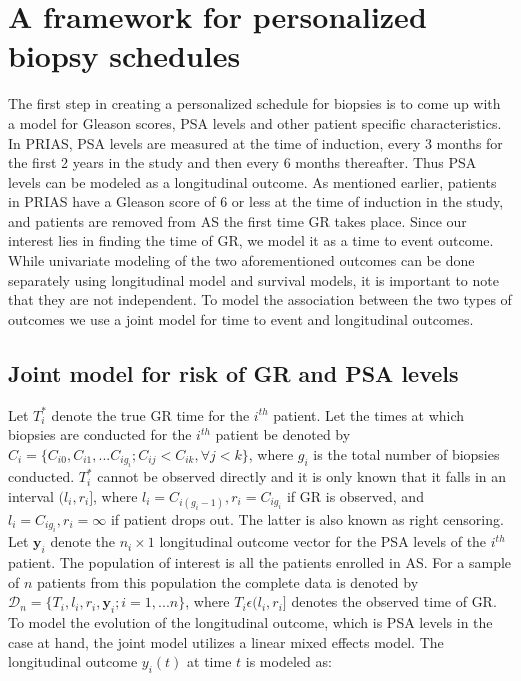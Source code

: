 
\section{A framework for personalized biopsy schedules}
\label{sec : framework_pers_biop_sched}
The first step in creating a personalized schedule for biopsies is to come up with a model for Gleason scores, PSA levels and other patient specific characteristics. In PRIAS, PSA levels are measured at the time of induction, every 3 months for the first 2 years in the study and then every 6 months thereafter. Thus PSA levels can be modeled as a longitudinal outcome. As mentioned earlier, patients in PRIAS have a Gleason score of 6 or less at the time of induction in the study, and patients are removed from AS the first time GR takes place. Since our interest lies in finding the time of GR, we model it as a time to event outcome. While univariate modeling of the two aforementioned outcomes can be done separately using longitudinal model and survival models, it is important to note that they are not independent. To model the association between the two types of outcomes we use a joint model for time to event and longitudinal outcomes.

\subsection{Joint model for risk of GR and PSA levels}
\label{subsec : jm_definition}
Let $T_i^*$ denote the true GR time for the $i^{th}$ patient. Let the times at which biopsies are conducted for the $i^{th}$ patient be denoted by $C_i = \{C_{i0}, C_{i1}, ... C_{ig_i}; C_{ij} < C_{ik}, \forall j<k \}$, where $g_i$ is the total number of biopsies conducted. $T_i^*$ cannot be observed directly and it is only known that it falls in an interval $(l_i, r_i]$, where $l_i = C_{i(g_i-1)}, r_i = C_{ig_i}$ if GR is observed, and $l_i = C_{ig_i}, r_i=\infty$ if patient drops out. The latter is also known as right censoring. Let $\boldsymbol{y}_i$ denote the $n_i \times 1$ longitudinal outcome vector for the PSA levels of the $i^{th}$ patient. The population of interest is all the patients enrolled in AS. For a sample of $n$ patients from this population the complete data is denoted by $\mathcal{D}_n = \{T_i, l_i, r_i, \boldsymbol{y}_i; i = 1,...n\}$, where $T_i \epsilon (l_i, r_i]$ denotes the observed time of GR.\\

To model the evolution of the longitudinal outcome, which is PSA levels in the case at hand, the joint model utilizes a linear mixed effects model. The longitudinal outcome $y_i(t)$ at time $t$ is modeled as:

